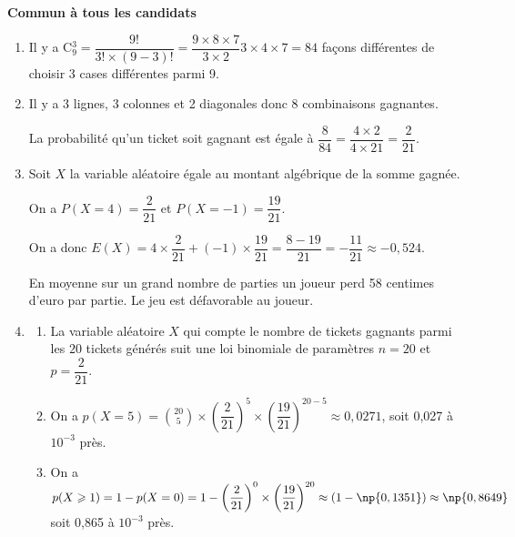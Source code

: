 \textbf{Commun à tous les candidats}

\medskip

















\medskip

\begin{enumerate}
\item 
Il y a C$_9^3 = \dfrac{9!}{3! \times (9 - 3)!} = \dfrac{9 \times 8 \times 7}{3 \times 2}3 \times 4 \times 7 = 84$ façons différentes de choisir 3 cases différentes parmi 9.
\item 
Il y a 3 lignes, 3 colonnes et 2 diagonales donc 8 combinaisons gagnantes.

La probabilité qu'un ticket soit gagnant est égale à $\dfrac{8}{84} = \dfrac{4\times 2}{4 \times 21} = \dfrac{2}{21}$.
\item 
Soit $X$ la variable aléatoire égale au montant algébrique de la somme gagnée.

On a $P(X  = 4) = \dfrac{2}{21}$ et $P(X = - 1) = \dfrac{19}{21}$.

On a donc $E(X) = 4 \times \dfrac{2}{21} + (- 1) \times \dfrac{19}{21} = \dfrac{8 - 19}{21} = - \dfrac{11}{21} \approx - 0,524$.

En moyenne sur un grand nombre de parties un joueur perd 58 centimes d'euro par partie. Le jeu est défavorable au joueur.
\item 
	\begin{enumerate}
		\item 
La variable aléatoire $X$ qui compte le nombre de tickets gagnants parmi les $20$ tickets générés suit une loi binomiale de paramètres $n = 20$ et $p = \dfrac{2}{21}$.
		\item 
On a $p(X = 5) = \binom{20}{5}\times \left(\dfrac{2}{21}\right)^5\times \left(\dfrac{19}{21}\right)^{20-5} \approx 0,0271$, soit 0,027 à $10^{-3}$ près.
		\item 
On a $p(X \geqslant 1) = 1 - p(X = 0) = 1 - \left(\dfrac{2}{21}\right)^{0}\times \left(\dfrac{19}{21}\right)^{20}  \approx (1 - \np{0,1351}) \approx \np{0,8649}$ soit 0,865 à $10^{-3}$ près.
	\end{enumerate}
\end{enumerate}

\bigskip

